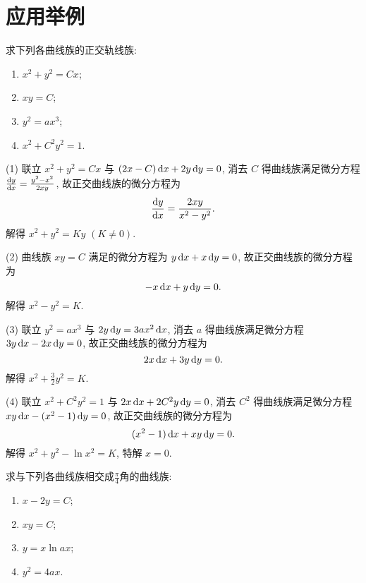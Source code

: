 \section{应用举例}



\begin{exercise}
  求下列各曲线族的正交轨线族:
  \begin{enumerate}[(1)]
  \item $x^2+y^2=Cx$;
  \item $xy=C$;
  \item $y^2=ax^3$;
  \item $x^2+C^2y^2=1$.
  \end{enumerate}
\end{exercise}

\begin{solution}
  (1) 联立 $x^2+y^2=Cx$ 与 $(2x-C)\mathop{}\!\mathrm{d} x+2y\mathop{}\!\mathrm{d} y=0$,
  消去 $C$ 得曲线族满足微分方程 $\frac{\mathop{}\!\mathrm{d} y}{\mathop{}\!\mathrm{d} x}=\frac{y^2-x^2}{2xy}$,
  故正交曲线族的微分方程为
  \[\frac{\mathop{}\!\mathrm{d} y}{\mathop{}\!\mathrm{d} x}=\frac{2xy}{x^2-y^2}.\]
  解得 $x^2+y^2=Ky$ $(K\neq 0)$.

  (2) 曲线族 $xy=C$ 满足的微分方程为 $y\mathop{}\!\mathrm{d} x+x\mathop{}\!\mathrm{d} y=0$, 故正交曲线族的微分方程为
  \[-x\mathop{}\!\mathrm{d} x+y\mathop{}\!\mathrm{d} y=0.\]
  解得 $x^2-y^2=K$.

  (3) 联立 $y^2=ax^3$ 与 $2y\mathop{}\!\mathrm{d} y=3ax^2\mathop{}\!\mathrm{d} x$,
  消去 $a$ 得曲线族满足微分方程 $3y\mathop{}\!\mathrm{d} x-2x\mathop{}\!\mathrm{d} y=0$, 故正交曲线族的微分方程为
  \[2x\mathop{}\!\mathrm{d} x+3y\mathop{}\!\mathrm{d} y=0.\]
  解得 $x^2+\frac{3}{2}y^2=K$.

  (4) 联立 $x^2+C^2y^2=1$ 与 $2x\mathop{}\!\mathrm{d} x+2C^2y\mathop{}\!\mathrm{d} y=0$,
  消去 $C^2$ 得曲线族满足微分方程 $xy\mathop{}\!\mathrm{d} x-(x^2-1)\mathop{}\!\mathrm{d} y=0$, 故正交曲线族的微分方程为
  \[(x^2-1)\mathop{}\!\mathrm{d} x+xy\mathop{}\!\mathrm{d} y=0.\]
  解得 $x^2+y^2-\ln x^2=K$, 特解 $x=0$.
\end{solution}



\begin{exercise}
  求与下列各曲线族相交成$\frac{\pi}{4}$角的曲线族:
  \begin{enumerate}[(1)]
  \item $x-2y=C$;
  \item $xy=C$;
  \item $y=x\ln ax$;
  \item $y^2=4ax$.
  \end{enumerate}
\end{exercise}

